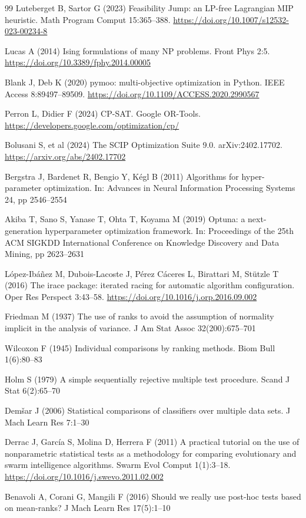 \documentclass[pdflatex,sn-mathphys-num]{sn-jnl}
\theoremstyle{thmstyleone}
\theoremstyle{thmstylethree}
\begin{document}
\begin{thebibliography}{99}
Luteberget B, Sartor G (2023) Feasibility Jump: an LP-free Lagrangian MIP heuristic. Math Program Comput 15:365--388. \url{https://doi.org/10.1007/s12532-023-00234-8}

Lucas A (2014) Ising formulations of many NP problems. Front Phys 2:5. \url{https://doi.org/10.3389/fphy.2014.00005}

Blank J, Deb K (2020) pymoo: multi-objective optimization in Python. IEEE Access 8:89497--89509. \url{https://doi.org/10.1109/ACCESS.2020.2990567}

Perron L, Didier F (2024) CP-SAT. Google OR-Tools. \url{https://developers.google.com/optimization/cp/}

Bolusani S, et al (2024) The SCIP Optimization Suite 9.0. arXiv:2402.17702. \url{https://arxiv.org/abs/2402.17702}

Bergstra J, Bardenet R, Bengio Y, K\'egl B (2011) Algorithms for hyper-parameter optimization. In: Advances in Neural Information Processing Systems 24, pp 2546--2554

Akiba T, Sano S, Yanase T, Ohta T, Koyama M (2019) Optuna: a next-generation hyperparameter optimization framework. In: Proceedings of the 25th ACM SIGKDD International Conference on Knowledge Discovery and Data Mining, pp 2623--2631

L\'opez-Ib\'a\~nez M, Dubois-Lacoste J, P\'erez C\'aceres L, Birattari M, St\"utzle T (2016) The irace package: iterated racing for automatic algorithm configuration. Oper Res Perspect 3:43--58. \url{https://doi.org/10.1016/j.orp.2016.09.002}

Friedman M (1937) The use of ranks to avoid the assumption of normality implicit in the analysis of variance. J Am Stat Assoc 32(200):675--701

Wilcoxon F (1945) Individual comparisons by ranking methods. Biom Bull 1(6):80--83

Holm S (1979) A simple sequentially rejective multiple test procedure. Scand J Stat 6(2):65--70

Dem\v{s}ar J (2006) Statistical comparisons of classifiers over multiple data sets. J Mach Learn Res 7:1--30

Derrac J, Garc\'ia S, Molina D, Herrera F (2011) A practical tutorial on the use of nonparametric statistical tests as a methodology for comparing evolutionary and swarm intelligence algorithms. Swarm Evol Comput 1(1):3--18. \url{https://doi.org/10.1016/j.swevo.2011.02.002}

Benavoli A, Corani G, Mangili F (2016) Should we really use post-hoc tests based on mean-ranks? J Mach Learn Res 17(5):1--10

\end{thebibliography}
\end{document}
